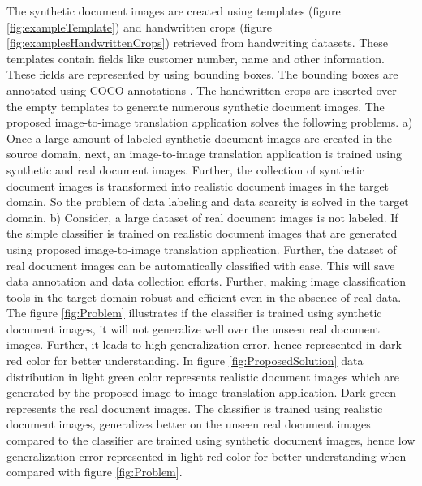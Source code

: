The synthetic document images are created using templates (figure \ref{fig:exampleTemplate}) and handwritten crops (figure \ref{fig:examplesHandwrittenCrops}) retrieved from handwriting datasets. These templates contain fields like customer number, name and other information. These fields are represented by using bounding boxes. The bounding boxes are annotated using \ac{COCO} annotations \cite{10.1007/978-3-319-10602-1_48}. The handwritten crops are inserted over the empty templates to generate numerous synthetic document images. The proposed image-to-image translation application solves the following problems. a) Once a large amount of labeled synthetic document images are created in the source domain, next, an image-to-image translation application is trained using synthetic and real document images. Further, the collection of synthetic document images is transformed into realistic document images in the target domain. So the problem of data labeling and data scarcity is solved in the target domain. b) Consider, a large dataset of real document images is not labeled. If the simple classifier is trained on realistic document images that are generated using proposed image-to-image translation application. Further, the dataset of real document images can be automatically classified with ease. This will save data annotation and data collection efforts. Further, making image classification tools in the target domain robust and efficient even in the absence of real data. The figure \ref{fig:Problem} illustrates if the classifier is trained using synthetic document images, it will not generalize well over the unseen real document images. Further, it leads to high generalization error, hence represented in dark red color for better understanding. In figure \ref{fig:ProposedSolution} data distribution in light green color represents realistic document images which are generated by the proposed image-to-image translation application. Dark green represents the real document images.  The classifier is trained using realistic document images, generalizes better on the unseen real document images compared to the classifier are trained using synthetic document images, hence low generalization error represented in light red color for better understanding when compared with figure \ref{fig:Problem}.

